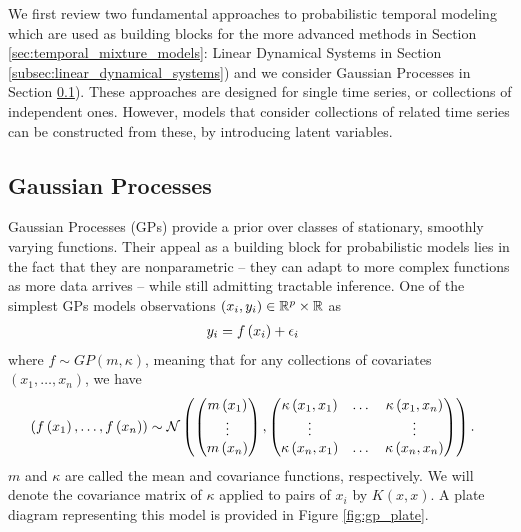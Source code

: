 \documentclass[14pt]{extreport}
\begin{document}
We first review two fundamental approaches to probabilistic temporal modeling
which are used as building blocks for the more advanced methods in Section
\ref{sec:temporal_mixture_models}: Linear Dynamical Systems in Section
\ref{subsec:linear_dynamical_systems}) and we consider Gaussian Processes in
Section \ref{subsec:gaussian_processes}). These approaches are designed for
single time series, or collections of independent ones. However, models that
consider collections of related time series can be constructed from these, by
introducing latent variables.

\subsection{Gaussian Processes}
\label{subsec:gaussian_processes}

Gaussian Processes (GPs) provide a prior over classes of stationary, smoothly
varying functions. Their appeal as a building block for probabilistic models
lies in the fact that they are nonparametric -- they can adapt to more complex
functions as more data arrives -- while still admitting tractable inference. One
of the simplest GPs models observations $\left(x_{i}, y_{i}\right) \in
\mathbb{R}^{p}\times \mathbb{R}$ as
\begin{align*}
  y_{i} &= f\left(x_{i}\right) + \epsilon_{i}
\end{align*}
where $f \sim GP\left(m, \kappa\right)$, meaning that for any collections of
covariates $\left(x_{1}, \dots, x_{n}\right)$, we have
\begin{align*}
  \left(f\left(x_{1}\right), \dots, f\left(x_{n}\right)\right) &\sim
  \mathcal{N}\left( \begin{pmatrix} m\left(x_{1}\right) \\ \vdots \\ m\left(x_{n}\right) \end{pmatrix}, \begin{pmatrix} \kappa\left(x_{1}, x_{1}\right) & \dots & \kappa\left(x_{1}, x_{n}\right) \\ \vdots & & \vdots \\ \kappa\left(x_{n}, x_{1}\right) & \dots &\kappa\left(x_{n}, x_{n}\right) \end{pmatrix}\right).
\end{align*}
$m$ and $\kappa$ are called the mean and covariance functions, respectively. We
will denote the covariance matrix of $\kappa$ applied to pairs of $x_{i}$ by
$K\left(x, x\right)$. A plate diagram representing this model is provided in
Figure \ref{fig:gp_plate}.
\end{document}
